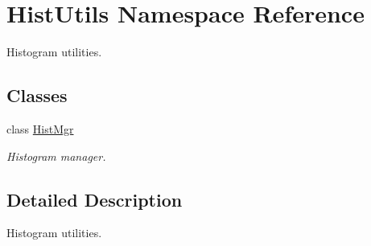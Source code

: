 \hypertarget{namespaceHistUtils}{}\section{Hist\+Utils Namespace Reference}
\label{namespaceHistUtils}


Histogram utilities.  


\subsection*{Classes}
\begin{DoxyCompactItemize}
\item 
class \hyperlink{classHistUtils_1_1HistMgr}{Hist\+Mgr}
\begin{DoxyCompactList}\small\item\em Histogram manager. \end{DoxyCompactList}\end{DoxyCompactItemize}


\subsection{Detailed Description}
Histogram utilities. 